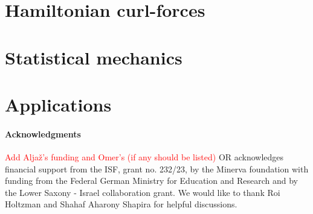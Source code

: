 \documentclass[a4paper]{article}
\numberwithin{equation}{section}
\begin{document}
\section{Hamiltonian curl-forces}

\label{sec:HCF}


\section{Statistical mechanics}
\label{sec:StochDyn}


\section{Applications}
\label{Sec:Applications}



 \paragraph{Acknowledgments}
\textcolor{red}{Add Alja\v{z}'s funding and Omer's (if any should be listed)}
OR acknowledges financial support from the ISF, grant no. 232/23,  by the Minerva foundation with funding from the Federal German Ministry for Education and Research and by the Lower Saxony - Israel collaboration grant. We would like to thank Roi Holtzman and Shahaf Aharony Shapira for helpful discussions.
 
% 
% 
\printbibliography
\end{document}
